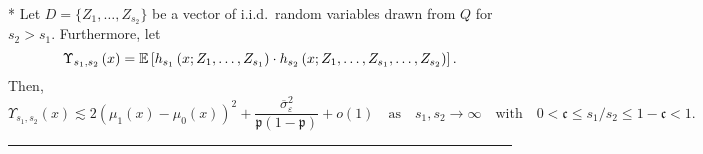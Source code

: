 \newpage
\begin{lem}\label{lem:CATE_upsilon_s}\mbox{}\\*
	Let $D = \{Z_1, \dotsc, Z_{s_2}\}$ be a vector of i.i.d.\ random variables drawn from $Q$ for $s_2 > s_1$.
	Furthermore, let
	\begin{equation}
		\Upsilon_{s_1, s_2}\left(x\right)
		= \mathbb{E}\left[h_{s_1}\left(x; Z_1, \ldots,  Z_{s_1}\right) \cdot
			h_{s_2}\left(x; Z_1, \ldots,Z_{s_1}, \ldots, Z_{s_2}\right)\right].
	\end{equation}
	Then,
	\begin{equation}
		\Upsilon_{s_1, s_2}\left(x\right)
		\lesssim  2\left(\mu_1(x) - \mu_0(x)\right)^2 + \frac{\overline{\sigma}^2_{\varepsilon}}{\mathfrak{p}(1 - \mathfrak{p})} + o(1)
		\quad \text{as} \quad s_1, s_2 \rightarrow \infty
		\quad \text{with} \quad
		0 < \mathfrak{c} \leq s_1 / s_2 \leq 1 - \mathfrak{c} < 1.
	\end{equation}
\end{lem}
\hrule
